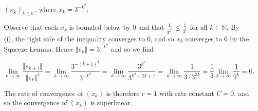 $(x_k)_{k \in \mathbb{N}}$, where $x_k = 3^{-k^2}$.

\begin{solution}
  Observe that each $x_k$ is bounded below by 0 and that $\frac{1}{3^{k^2}} \le \frac{1}{3^k}$ for all 
  $k \in \mathbb{N}$. By (i), the right side of the inequality converges to 0, and so $x_k$ converges to 0 by the 
  Squeeze Lemma. Hence $\Vert e_{k} \Vert = 3^{-k^2}$ and so we find

  $$
    \lim\limits_{k \to \infty} \frac{\Vert e_{k+1} \Vert}{\Vert e_k \Vert^1} 
        = \lim\limits_{k \to \infty} \frac{3^{-(k+1)^2}}{3^{-k^2}}
        = \lim\limits_{k \to \infty} \frac{3^{k^2}}{3^{k^2 + 2k + 1}}
        = \lim\limits_{k \to \infty} \frac{1}{3 \cdot 3^{2k}}
        = \frac{1}{3} \lim\limits_{k \to \infty} \frac{1}{9^k}
        = 0.
  $$

  The rate of convergence of $(x_k)$ is therefore $r = 1$ with rate constant $C = 0$, and so the convergence
  of $(x_k)$ is superlinear.
  \ \\
\end{solution}